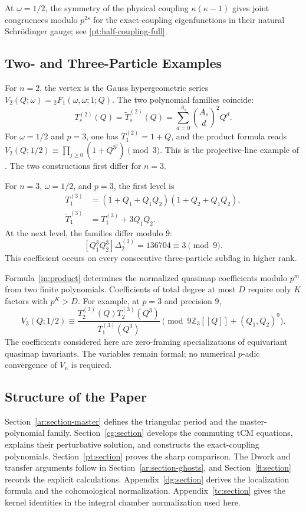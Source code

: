 \documentclass[11pt]{amsart}
\theoremstyle{definition}
\theoremstyle{remark}
\numberwithin{equation}{section}
\newcommand{\Z}{\mathbb Z}
\begin{document}
At $\omega=1/2$, the symmetry of the physical coupling
$\kappa(\kappa-1)$ gives joint congruences modulo $p^{2s}$
for the exact-coupling eigenfunctions in their
natural Schr\"odinger gauge; see \eqref{pt:half-coupling-full}.

\subsection{Two- and Three-Particle Examples}
For $n=2$, the vertex is the Gauss hypergeometric series
$V_2(Q;\omega)={}_2F_1(\omega,\omega;1;Q)$. The two
polynomial families coincide:
\[
 T_s^{(2)}(Q)=\widetilde T_s^{(2)}(Q)
 =\sum_{d=0}^{A_s}\binom{A_s}{d}^{\!2}Q^d.
\]
For $\omega=1/2$ and $p=3$, one has $T_1^{(2)}=1+Q$,
and the product formula reads
$V_2(Q;1/2)\equiv\prod_{j\geq0}(1+Q^{3^j})\pmod3$.
This is the projective-line example of \cite{SV23}.
The two constructions first differ for $n=3$.

For $n=3$, $\omega=1/2$, and $p=3$, the first level is
\begin{align*}
 T_1^{(3)}&=(1+Q_1+Q_1Q_2)(1+Q_2+Q_1Q_2),\\
 \widetilde T_1^{(3)}&=T_1^{(3)}+3Q_1Q_2.
\end{align*}
At the next level, the families differ modulo $9$:
\[
 [Q_1^3Q_2^3]\Delta_2^{(3)}=136704\equiv3\pmod9.
\]
This coefficient occurs on every consecutive three-particle
subflag in higher rank.

Formula~\eqref{in:product} determines the normalized quasimap
coefficients modulo $p^m$ from two finite polynomials.
Coefficients of total degree at most $D$ require only $K$ factors
with $p^K>D$. For example, at $p=3$ and precision $9$,
\[
 V_3(Q;1/2)\equiv
 \frac{T_2^{(3)}(Q)T_2^{(3)}(Q^3)}{T_1^{(3)}(Q^3)}
 \pmod{9\Z_3[[Q]]+(Q_1,Q_2)^9}.
\]
The coefficients considered here are zero-framing specializations
of equivariant quasimap invariants. The variables remain formal;
no numerical $p$-adic convergence of $V_n$ is required.

\subsection{Structure of the Paper}
Section~\ref{ar:section-master} defines the triangular period and
the master-polynomial family. Section~\ref{cg:section} develops
the commuting tCM equations, explains their perturbative
solution, and constructs the exact-coupling polynomials.
Section~\ref{pt:section} proves the sharp
comparison. The Dwork and transfer arguments follow in
Section~\ref{ar:section-ghosts}, and
Section~\ref{fl:section} records the explicit calculations.
Appendix~\ref{dg:section}
derives the localization formula and the cohomological normalization.
Appendix~\ref{tc:section} gives the kernel identities in the
integral chamber normalization used here.
\end{document}
